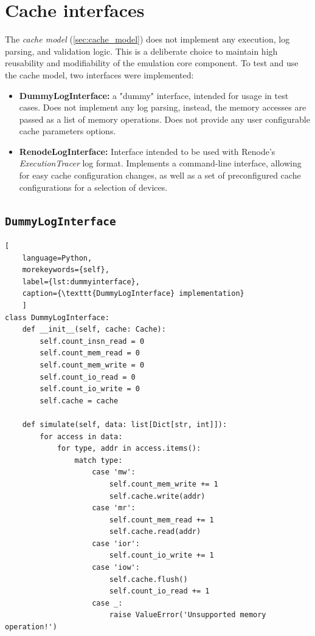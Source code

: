 \section{Cache interfaces}

The \textit{cache model} (\ref{sec:cache_model}) does not implement any execution, log parsing, and validation logic. This is a deliberate choice to maintain high reusability and modifiability
of the emulation core component. To test and use the cache model, two interfaces were implemented:

\begin{itemize}
	\item \textbf{DummyLogInterface:} a "dummy" interface, intended for usage in test cases. Does not implement any log parsing, instead, the memory accesses are passed as a list of
        memory operations. Does not provide any user configurable cache parameters options.
    \item \textbf{RenodeLogInterface:} Interface intended to be used with Renode's \textit{ExecutionTracer} log format. Implements a command-line interface, allowing for easy cache
        configuration changes, as well as a set of preconfigured cache configurations for a selection of devices.
\end{itemize}


\subsection{\texttt{DummyLogInterface}}

\begin{center}
\centering
\begin{minipage}{\linewidth}
\begin{lstlisting}[
    language=Python,
	morekeywords={self},
    label={lst:dummyinterface},
    caption={\texttt{DummyLogInterface} implementation}
    ]
class DummyLogInterface:
    def __init__(self, cache: Cache):
        self.count_insn_read = 0
        self.count_mem_read = 0
        self.count_mem_write = 0
        self.count_io_read = 0
        self.count_io_write = 0
        self.cache = cache

    def simulate(self, data: list[Dict[str, int]]):
        for access in data:
            for type, addr in access.items():
                match type:
                    case 'mw':
                        self.count_mem_write += 1
                        self.cache.write(addr)
                    case 'mr':
                        self.count_mem_read += 1
                        self.cache.read(addr)
                    case 'ior':
                        self.count_io_write += 1
                    case 'iow':
                        self.cache.flush()
                        self.count_io_read += 1
                    case _:
                        raise ValueError('Unsupported memory operation!')
\end{lstlisting}
\end{minipage}
\end{center}

